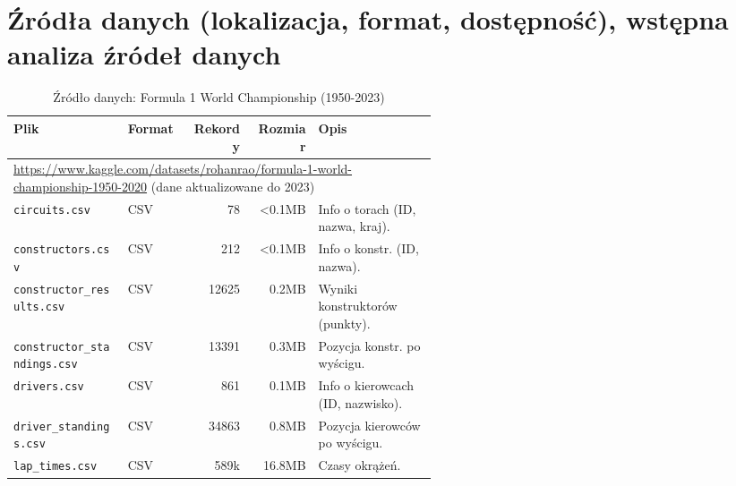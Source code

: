 \documentclass[a4paper,12pt]{article}
\begin{document}
\section{Źródła danych (lokalizacja, format, dostępność), wstępna analiza źródeł danych}
\label{sec:zrodla_danych_final}

\begin{table}[H]
  \centering
  \caption{Źródło danych: Formula 1 World Championship (1950-2023)}
  \label{tab:zrodlo_f1_final}
  \tiny
  \begin{tabular}{|p{0.27\linewidth}|l|r|r|p{0.28\linewidth}|}
    \hline
    \textbf{Plik}                       & \textbf{Format} & \textbf{Rekordy} & \textbf{Rozmiar} & \textbf{Opis}                                                                                  \\
    \hline
    \multicolumn{5}{|l|}{\parbox{\dimexpr\linewidth-2\tabcolsep\relax}{\tiny\url{https://www.kaggle.com/datasets/rohanrao/formula-1-world-championship-1950-2020} (dane aktualizowane do 2023)}} \\
    \hline
    \texttt{circuits.csv}               & CSV             & 78               & <0.1MB           & Info o torach (ID, nazwa, kraj).                                                               \\
    \texttt{constructors.csv}           & CSV             & 212              & <0.1MB           & Info o konstr. (ID, nazwa).                                                                    \\
    \texttt{constructor\_results.csv}   & CSV             & 12625            & 0.2MB            & Wyniki konstruktorów (punkty).                                                                 \\
    \texttt{constructor\_standings.csv} & CSV             & 13391            & 0.3MB            & Pozycja konstr. po wyścigu.                                                                    \\
    \texttt{drivers.csv}                & CSV             & 861              & 0.1MB            & Info o kierowcach (ID, nazwisko).                                                              \\
    \texttt{driver\_standings.csv}      & CSV             & 34863            & 0.8MB            & Pozycja kierowców po wyścigu.                                                                  \\
    \texttt{lap\_times.csv}             & CSV             & 589k             & 16.8MB           & Czasy okrążeń.                                                                                 \\

\end{tabular}
\end{table}
\end{document}
